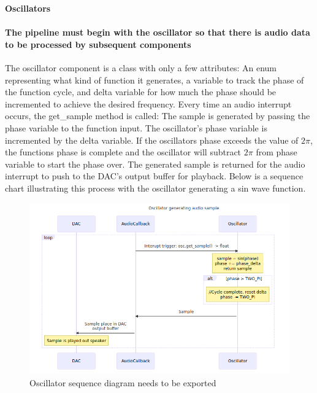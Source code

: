 \documentclass[acmlarge,screen]{acmart}
\begin{document}
	\textbf{Oscillators}
	\paragraph{The pipeline must begin with the oscillator so that there is audio data to be processed by subsequent components} The oscillator component is a class with only a few attributes: An enum representing what kind of function it generates, a variable to track the phase of the function cycle, and delta variable for how much the phase should be incremented to achieve the desired frequency. Every time an audio interrupt occurs, the get\_sample method is called: The sample is generated by passing the phase variable to the function input. The oscillator's phase variable is incremented by the delta variable. If the oscillators phase exceeds the value of \( 2\pi \), the functions phase is complete and the oscillator will subtract \( 2\pi \) from phase variable to start the phase over. The generated sample is returned for the audio interrupt to push to the DAC's output buffer for playback. Below is a sequence chart illustrating this process with the oscillator generating a sin wave function.\cite{farnell_2010}
	
	\begin{figure}
		\includegraphics[width=\linewidth]{oscillator_sequence_diagram}
		\caption{Oscillator sequence diagram needs to be exported}
		\centering
	\end{figure}
	
\end{document}
